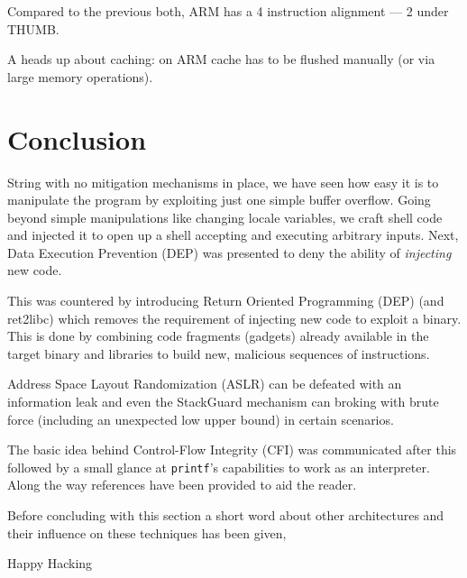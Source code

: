 \documentclass[article]{uibk}
\begin{document}
Compared to the previous both, ARM has a \SI{4}{\byte} instruction alignment
--- \SI{2}{\byte} under THUMB.

A heads up about caching: on ARM cache has to be flushed manually (or via large
memory operations).

\section{Conclusion}

String with no mitigation mechanisms in place, we have seen how easy it is to
manipulate the program by exploiting just one simple buffer overflow. Going
beyond simple manipulations like changing locale variables, we craft shell code
and injected it to open up a shell accepting and executing arbitrary inputs.
Next, Data Execution Prevention (DEP) was presented to deny the ability of
\emph{injecting} new code.

This was countered by introducing Return Oriented Programming (DEP) (and
ret2libc) which removes the requirement of injecting new code to exploit a
binary. This is done by combining code fragments (gadgets) already available in
the target binary and libraries to build new, malicious sequences of
instructions.

Address Space Layout Randomization (ASLR) can be defeated with an information
leak and even the StackGuard mechanism can broking with brute force (including
an unexpected low upper bound) in certain scenarios.

The basic idea behind Control-Flow Integrity (CFI) was communicated after this
followed by a small glance at \texttt{printf}'s capabilities to work as an
interpreter. Along the way references have been provided to aid the reader.

Before concluding with this section a short word about other architectures and
their influence on these techniques has been given,

Happy Hacking

\newpage


\end{document}
